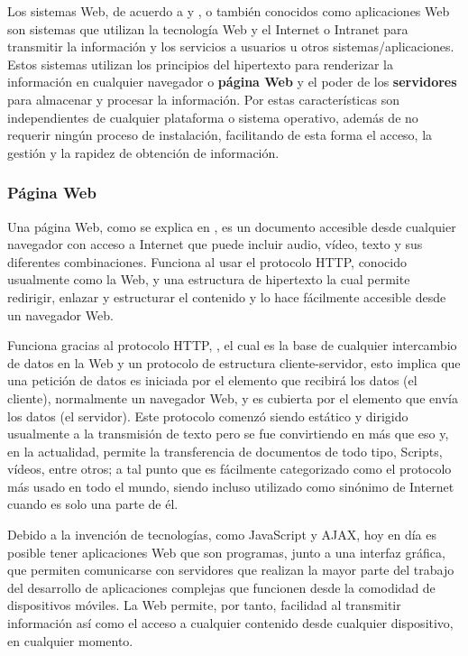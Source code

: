 Los sistemas Web, de acuerdo a \textcite{SistWeb1} y \textcite{wiki:systemWeb}, o
también conocidos como aplicaciones Web son sistemas que
utilizan la tecnología Web y el Internet o Intranet para transmitir la
información y los
servicios a usuarios u otros sistemas/aplicaciones. Estos sistemas utilizan los
principios del hipertexto para renderizar la información en cualquier
navegador o \textbf{página Web} y el poder de los \textbf{servidores} para
almacenar y procesar la información. Por estas características son independientes
de cualquier plataforma o sistema operativo, además de  no requerir ningún
proceso de instalación, facilitando de esta forma el acceso, la gestión y la
rapidez de obtención de información.



\subsubsection*{Página Web}
Una página Web, como se explica en \textcite{WebpageMozila},  es un documento
accesible desde cualquier navegador con acceso
a Internet que puede incluir audio, vídeo, texto y sus diferentes
combinaciones.
Funciona al usar el protocolo HTTP, conocido usualmente como la Web, y una
estructura de hipertexto la cual permite redirigir, enlazar y estructurar el
contenido y lo hace fácilmente accesible desde un navegador Web.

Funciona gracias al protocolo HTTP, ,
el cual es la base de cualquier intercambio de datos en la Web y un protocolo
de estructura cliente-servidor, esto implica que una petición de datos es
iniciada por el elemento que recibirá los datos (el cliente), normalmente un
navegador Web, y es cubierta por el elemento que envía los datos (el servidor).
Este protocolo comenzó siendo estático y dirigido usualmente a la transmisión de
texto pero se fue convirtiendo en más que eso y, en la actualidad, permite la
transferencia de documentos de todo tipo, Scripts, vídeos, entre otros; a tal
punto que es fácilmente categorizado como el protocolo más usado en todo el
mundo, siendo incluso utilizado como sinónimo de Internet cuando es solo una
parte de él.

Debido a la invención de tecnologías, como JavaScript y AJAX, hoy en día es
posible tener aplicaciones Web que son programas, junto a una interfaz gráfica,
que permiten comunicarse con servidores que realizan la mayor parte del trabajo
del desarrollo de aplicaciones complejas que funcionen desde la
comodidad de dispositivos móviles. La Web permite, por tanto, facilidad al
transmitir información así como el acceso a cualquier contenido desde
cualquier dispositivo, en cualquier momento.

